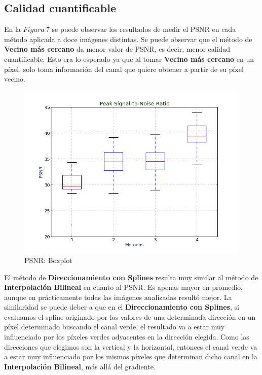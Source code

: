 \documentclass[a4paper]{article}
\begin{document}
\newpage
\subsection{Calidad cuantificable}


En la $Figura\ 7$ se puede observar los resultados de medir el PSNR en cada método aplicada a doce imágenes distintas. Se puede observar que el método de \textbf{Vecino más cercano} da menor valor de PSNR, es decir, menor calidad cuantificable. Esto era lo esperado ya que al tomar \textbf{Vecino más cercano} en un píxel, solo toma información del canal que quiere obtener a partir de su píxel vecino.\newline
\begin{figure}[htbp]
\centering
\includegraphics[width=340pt]{img/PSNR.png}
\caption{PSNR: Boxplot}
\end{figure}
El método de \textbf{Direccionamiento con Splines} resulta muy similar al método de \textbf{Interpolación Bilineal} en cuanto al PSNR. Es apenas mayor en promedio, aunque en prácticamente todas las imágenes analizadas resultó mejor. La similaridad se puede deber a que en el \textbf{Direccionamiento con Splines}, si evaluamos el spline originado por los valores de una determinada dirección en un píxel determinado buscando el canal verde, el resultado va a estar muy influenciado por los píxeles verdes adyacentes en la dirección elegida. Como las direcciones que elegimos son la vertical y la horizontal, entonces el canal verde va a estar muy influenciado por los mismos píxeles que determinan dicho canal en la \textbf{Interpolación Bilineal}, más allá del gradiente.\\
\end{document}
